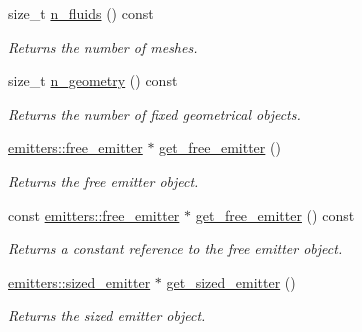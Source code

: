 \begin{DoxyCompactItemize}
size\+\_\+t \hyperlink{classphysim_1_1simulator_a09f70976676691fac655a7c4c5efba96}{n\+\_\+fluids} () const
\begin{DoxyCompactList}\small\item\em Returns the number of meshes. \end{DoxyCompactList}\item 
\mbox{\label{classphysim_1_1simulator_a77da641e3bba577bbbfe67a8bcfcbe26}} 
size\+\_\+t \hyperlink{classphysim_1_1simulator_a77da641e3bba577bbbfe67a8bcfcbe26}{n\+\_\+geometry} () const
\begin{DoxyCompactList}\small\item\em Returns the number of fixed geometrical objects. \end{DoxyCompactList}\item 
\mbox{\label{classphysim_1_1simulator_a038e443c30bb788124f4c223f1dc6b2b}} 
\hyperlink{classphysim_1_1emitters_1_1free__emitter}{emitters\+::free\+\_\+emitter} $\ast$ \hyperlink{classphysim_1_1simulator_a038e443c30bb788124f4c223f1dc6b2b}{get\+\_\+free\+\_\+emitter} ()
\begin{DoxyCompactList}\small\item\em Returns the free emitter object. \end{DoxyCompactList}\item 
\mbox{\label{classphysim_1_1simulator_a48a574582fa0d04712f222456d79e834}} 
const \hyperlink{classphysim_1_1emitters_1_1free__emitter}{emitters\+::free\+\_\+emitter} $\ast$ \hyperlink{classphysim_1_1simulator_a48a574582fa0d04712f222456d79e834}{get\+\_\+free\+\_\+emitter} () const
\begin{DoxyCompactList}\small\item\em Returns a constant reference to the free emitter object. \end{DoxyCompactList}\item 
\mbox{\label{classphysim_1_1simulator_a4eb508e0264771e4e61d37eca4aa45a1}} 
\hyperlink{classphysim_1_1emitters_1_1sized__emitter}{emitters\+::sized\+\_\+emitter} $\ast$ \hyperlink{classphysim_1_1simulator_a4eb508e0264771e4e61d37eca4aa45a1}{get\+\_\+sized\+\_\+emitter} ()
\begin{DoxyCompactList}\small\item\em Returns the sized emitter object. \end{DoxyCompactList}\item 

\end{DoxyCompactItemize}
